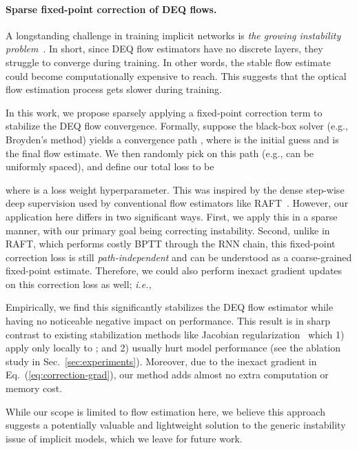 \documentclass[10pt,twocolumn,letterpaper]{article}
\def\ie{\textit{i.e.,~}}
\begin{document}
\vspace{-.35cm}
\paragraph{Sparse fixed-point correction of DEQ flows.} A longstanding challenge in training implicit networks is \emph{the growing instability problem}~\cite{DEQ,DEQ_JR,MON,SamyFPN,PhantomGrad,chen2018neural,dupont2019augmented,kelly2020learning}. In short, since DEQ flow estimators have no discrete layers, they struggle to converge during training.
In other words, the stable flow estimate  could become computationally expensive to reach. This suggests that the optical flow estimation process gets slower during training.

In this work, we propose sparsely applying a fixed-point correction term to stabilize the DEQ flow convergence. Formally, suppose the black-box solver (e.g., Broyden's method) yields a convergence path , where  is the initial guess and  is the final flow estimate. We then randomly pick  on this path (e.g., can be uniformly spaced), and define our total loss to be

where  is a loss weight hyperparameter. This was inspired by the dense step-wise deep supervision used by conventional flow estimators like RAFT~\cite{RAFT}. However, our application here differs in two significant ways. First, we apply this in a sparse manner, with our primary goal being correcting instability. Second, unlike in RAFT, which performs costly BPTT through the RNN chain, this fixed-point correction loss is still \emph{path-independent} and can be understood as a coarse-grained fixed-point estimate. Therefore, we could also perform inexact gradient updates on this correction loss as well; \ie

Empirically, we find this significantly stabilizes the DEQ flow estimator while having no noticeable negative impact on performance. This result is in sharp contrast to existing stabilization methods like Jacobian regularization~\cite{DEQ_JR,hutchinson1989stochastic} which 1) apply only locally to ; and 2) usually hurt model performance (see the ablation study in Sec.~\ref{sec:experiments}). Moreover, due to the inexact gradient in Eq.~(\ref{eq:correction-grad}), our method adds almost no extra computation or memory cost. 

While our scope is limited to flow estimation here, we believe this approach suggests a potentially valuable and lightweight solution to the generic instability issue of implicit models, which we leave for future work.
\end{document}
